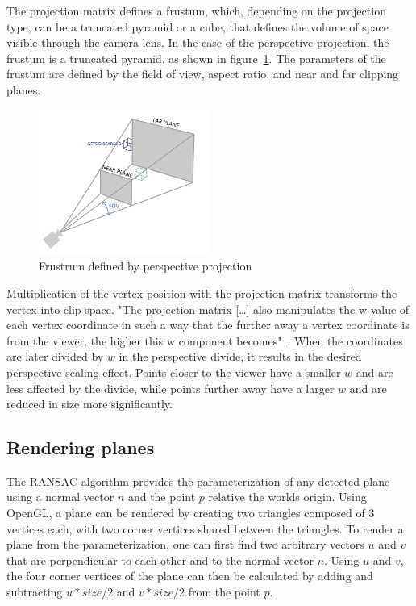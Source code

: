 The projection matrix defines a frustum, which, depending on the projection type, can be a truncated pyramid or a cube,
that defines the volume of space visible through the camera lens.
In the case of the perspective projection, the frustum is a truncated pyramid, as shown in figure~\ref{fig:perspective}.
The parameters of the frustum are defined by the field of view, aspect ratio, and near and far clipping planes.
\begin{figure}[h!]
    \centering
    \includegraphics[width=0.50\textwidth]{images/perspective}
    \caption{Frustrum defined by perspective projection}
    \label{fig:perspective}
\end{figure}
Multiplication of the vertex position with the projection matrix transforms the vertex into clip space.
"The projection matrix [\ldots] also manipulates the w value of each vertex coordinate in such a way
that the further away a vertex coordinate is from the viewer, the higher this w component becomes"~\parencite{de_vries_learn_2020}.
When the coordinates are later divided by $w$ in the perspective divide,
it results in the desired perspective scaling effect.
Points closer to the viewer have a smaller $w$ and are less affected by the divide,
while points further away have a larger $w$ and are reduced in size more significantly.


\subsection{Rendering planes}
The RANSAC algorithm provides the parameterization of any detected plane using a normal vector $n$ and the point $p$ relative the worlds origin.
Using OpenGL, a plane can be rendered by creating two triangles composed of 3 vertices each, with two corner vertices shared between the triangles.
To render a plane from the parameterization, one can first find two arbitrary vectors $u$ and $v$
that are perpendicular to each-other and to the normal vector $n$.
Using $u$ and $v$, the four corner vertices of the plane can then be calculated by adding and subtracting $u * size / 2$ and $v * size / 2$ from the point $p$.

